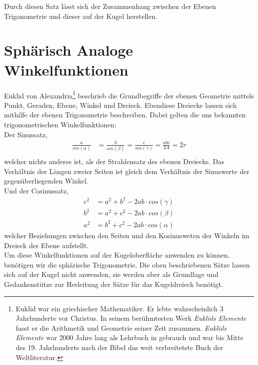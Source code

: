 \begin{refsection}
Durch diesen Satz lässt sich der Zusammenhang zwischen der Ebenen Trigonometrie und dieser auf der Kugel herstellen.



\section{Sphärisch Analoge Winkelfunktionen}
Euklid von Alexandria\footnote{%
Euklid war ein griechischer Mathematiker. Er lebte wahrscheinlich 3 Jahrhunderte vor Christus. In seinem berühmtesten Werk \textit{Euklids Elemente} fasst er die Arithmetik und Geometrie seiner Zeit zusammen. \textit{Euklids Elemente} war 2000 Jahre lang als Lehrbuch in gebrauch und war bis Mitte des 19. Jahrhunderts nach der Bibel das weit verbreitetste Buch der Weltliteratur.}  beschrieb die Grundbegriffe der ebenen Geometrie mittels Punkt, Geraden, Ebene, Winkel und Dreieck. Ebendiese Dreiecke lassen sich mithilfe der ebenen Trigonometrie beschreiben. Dabei gelten die uns bekannten trigonometrischen Winkelfunktionen:\\

Der Sinussatz,
\begin{align*}
\frac{ a }{ sin(\alpha) } &= \frac{ b }{sin(\beta)} = \frac{ c }{ sin(\gamma) } = \frac{abc}{2A} = 2r\\
\end{align*}
welcher nichts anderes ist, als der Strahlensatz des ebenen Dreiecks. Das Verhältnis der Längen zweier Seiten ist gleich dem Verhältnis der Sinuswerte der gegenüberliegenden Winkel.\\

Und der Cosinussatz,
\begin{align*}
c^{ 2 } &= a^{ 2 } + b^{ 2 } - 2ab\cdot cos(\gamma)\\
b^{ 2 } &= a^{ 2 } + c^{ 2 } - 2ab\cdot cos(\beta)\\
a^{ 2 } &= b^{ 2 } + c^{ 2 } - 2ab\cdot cos(\alpha)
\end{align*}
welcher Beziehungen zwischen den Seiten und den Kosinusweten der Winkeln im Dreieck der Ebene aufstellt.\\

Um diese Winkelfunktionen auf der Kugeloberfläche anwenden zu können, benötigen wir die sphärische Trigonometrie. Die oben beschriebenen Sätze lassen sich auf der Kugel nicht anwenden, sie werden aber als Grundlage und Gedankenstütze zur Herleitung der Sätze für das Kugeldreieck benötigt.




\end{refsection}
